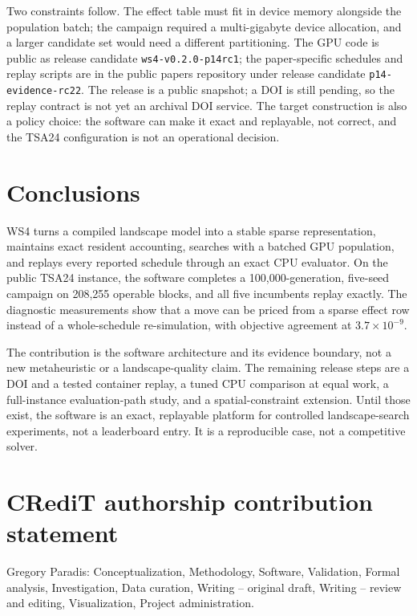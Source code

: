 \documentclass[a4paper,fleqn]{cas-sc}
\begin{document}
Two constraints follow. The effect table must fit in device memory alongside the population batch; the
campaign required a multi-gigabyte device allocation, and a larger candidate set would need a different
partitioning. The GPU code is public as release candidate \texttt{ws4-v0.2.0-p14rc1}; the paper-specific
schedules and replay scripts are in the public papers repository under release candidate
\texttt{p14-evidence-rc22}. The release is a public snapshot; a DOI is still pending, so the replay
contract is not yet an archival DOI service. The target
construction is also a policy choice: the software can make it exact and replayable, not correct, and
the TSA24 configuration is not an operational decision.

\section{Conclusions}

WS4 turns a compiled landscape model into a stable sparse representation, maintains exact resident
accounting, searches with a batched GPU population, and replays every reported schedule through an
exact CPU evaluator. On the public TSA24 instance, the software completes a 100,000-generation,
five-seed campaign on 208,255 operable blocks, and all five incumbents replay exactly. The diagnostic
measurements show that a move can be priced from a sparse effect row instead of a whole-schedule
re-simulation, with objective agreement at $3.7\times10^{-9}$.

The contribution is the software architecture and its evidence boundary, not a new metaheuristic or a
landscape-quality claim. The remaining release steps are a DOI and a tested container
replay, a tuned CPU comparison at equal work, a full-instance evaluation-path study, and a
spatial-constraint extension. Until those exist, the software is an exact, replayable platform for
controlled landscape-search experiments, not a leaderboard entry. It is a reproducible case, not a
competitive solver.

\section*{CRediT authorship contribution statement}

Gregory Paradis: Conceptualization, Methodology, Software, Validation, Formal analysis, Investigation,
Data curation, Writing -- original draft, Writing -- review and editing, Visualization, Project
administration.
\end{document}
